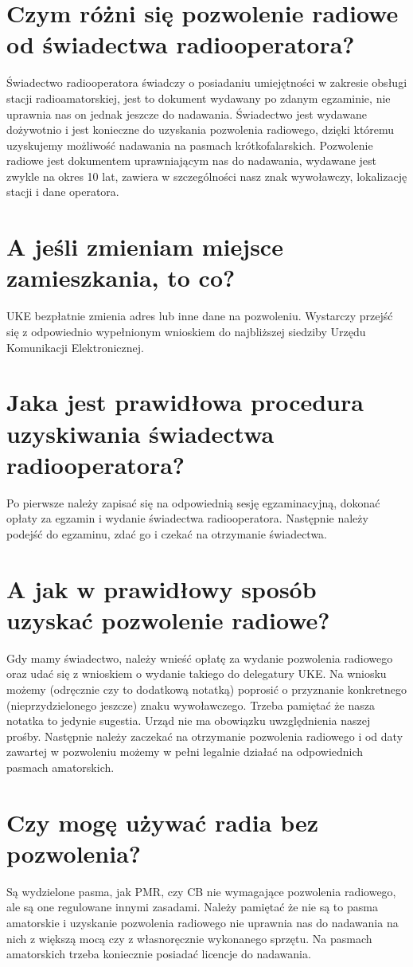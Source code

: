 \documentclass[a4paper,12pt]{article}
\begin{document}
\section{Czym różni się pozwolenie radiowe od świadectwa radiooperatora?}
Świadectwo radiooperatora świadczy o posiadaniu umiejętności w zakresie obsługi stacji radioamatorskiej, jest to dokument wydawany po zdanym egzaminie, nie uprawnia nas on jednak jeszcze do nadawania. Świadectwo jest wydawane dożywotnio i jest konieczne do uzyskania pozwolenia radiowego, dzięki któremu uzyskujemy możliwość nadawania na pasmach krótkofalarskich. Pozwolenie radiowe jest dokumentem uprawniającym nas do nadawania, wydawane jest zwykle na okres 10 lat, zawiera w szczególności nasz znak wywoławczy, lokalizację stacji i dane operatora.

\section{A jeśli zmieniam miejsce zamieszkania, to co?}
UKE bezpłatnie zmienia adres lub inne dane na pozwoleniu. Wystarczy przejść się z odpowiednio wypełnionym wnioskiem do najbliższej siedziby Urzędu Komunikacji Elektronicznej.

\section{Jaka jest prawidłowa procedura uzyskiwania świadectwa radiooperatora?}
Po pierwsze należy zapisać się na odpowiednią sesję egzaminacyjną, dokonać opłaty za egzamin i wydanie świadectwa radiooperatora. Następnie należy podejść do egzaminu, zdać go i czekać na otrzymanie świadectwa.

\section{A jak w prawidłowy sposób uzyskać pozwolenie radiowe?}
Gdy mamy świadectwo, należy wnieść opłatę za wydanie pozwolenia radiowego oraz udać się z wnioskiem o wydanie takiego do delegatury UKE. Na wniosku możemy (odręcznie czy to dodatkową notatką) poprosić o przyznanie konkretnego (nieprzydzielonego jeszcze) znaku wywoławczego. Trzeba pamiętać że nasza notatka to jedynie sugestia. Urząd nie ma obowiązku uwzględnienia naszej prośby. Następnie należy zaczekać na otrzymanie pozwolenia radiowego i od daty zawartej w pozwoleniu możemy w pełni legalnie działać na odpowiednich pasmach amatorskich.

\section{Czy mogę używać radia bez pozwolenia?}
Są wydzielone pasma, jak PMR, czy CB nie wymagające pozwolenia radiowego, ale są one regulowane innymi zasadami. Należy pamiętać że nie są to pasma amatorskie i uzyskanie pozwolenia radiowego nie uprawnia nas do nadawania na nich z większą mocą czy z własnoręcznie wykonanego sprzętu. Na pasmach amatorskich trzeba koniecznie posiadać licencje do nadawania.
\end{document}
